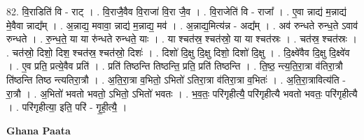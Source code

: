 \documentclass[17pt]{extarticle}
\begin{document}
82. वि॒राडिति॑ वि - राट् । . वि॒राजै॒वैव वि॒राजा॑ वि॒रा जै॒व । . वि॒राजेति॑ वि - राजा᳚ । . ए॒वा न्नाद्य॑ म॒न्नाद्य॑ मे॒वैवा न्नाद्य᳚म् । . अ॒न्नाद्य॒ मवावा॒ न्नाद्य॑ म॒न्नाद्य॒ मव॑ । . अ॒न्नाद्य॒मित्य॑न्न - अद्य᳚म् । . अव॑ रुन्धते रुन्ध॒ते ऽवाव॑ रुन्धते । . रु॒न्ध॒ते॒ या या रु॑न्धते रुन्धते॒ याः । . या श्चत॑स्र॒ श्चत॑स्रो॒ या या श्चत॑स्रः । . चत॑स्र॒ श्चत॑स्रः । . चत॑स्रो॒ दिशो॒ दिश॒ श्चत॑स्र॒ श्चत॑स्रो॒ दिशः॑ । . दिशो॑ दि॒क्षु दि॒क्षु दिशो॒ दिशो॑ दि॒क्षु । . दि॒क्ष्वे॑वैव दि॒क्षु दि॒क्ष्वे॑व । . ए॒व प्रति॒ प्रत्ये॒वैव प्रति॑ । . प्रति॑ तिष्ठन्ति तिष्ठन्ति॒ प्रति॒ प्रति॑ तिष्ठन्ति । . ति॒ष्ठ॒ न्त्य॒ति॒रा॒त्रा व॑तिरा॒त्रौ ति॑ष्ठन्ति तिष्ठ न्त्यतिरा॒त्रौ । . अ॒ति॒रा॒त्रा व॒भितो॒ ऽभितो॑ ऽतिरा॒त्रा व॑तिरा॒त्रा व॒भितः॑ । . अ॒ति॒रा॒त्रावित्य॑ति - रा॒त्रौ । . अ॒भितो॑ भवतो भवतो॒ ऽभितो॒ ऽभितो॑ भवतः । . भ॒व॒तः॒ परि॑गृहीत्यै॒ परि॑गृहीत्यै भवतो भवतः॒ परि॑गृहीत्यै । . परि॑गृहीत्या॒ इति॒ परि॑ - गृ॒ही॒त्यै॒ । \newline

\textbf{Ghana Paata } \newline
\end{document}
